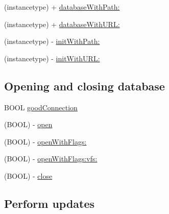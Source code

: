  

 \begin{DoxyCompactItemize}
\item 
(instancetype) + \mbox{\hyperlink{interface_o_p_t_l_y_f_m_d_b_database_a3828d13a7756446dca522294b569e0e7}{database\+With\+Path\+:}}
\item 
(instancetype) + \mbox{\hyperlink{interface_o_p_t_l_y_f_m_d_b_database_a13bb79efcda5db13674420ac4f805dd5}{database\+With\+U\+R\+L\+:}}
\item 
(instancetype) -\/ \mbox{\hyperlink{interface_o_p_t_l_y_f_m_d_b_database_a146d2b8c55019b67f45217aeb008e78e}{init\+With\+Path\+:}}
\item 
(instancetype) -\/ \mbox{\hyperlink{interface_o_p_t_l_y_f_m_d_b_database_a4fe721948e8ceefcdd65f0850b7c07b7}{init\+With\+U\+R\+L\+:}}
\end{DoxyCompactItemize}
\subsection*{Opening and closing database}
\label{_amgrp53491ef07cbf8f5e62a2c5067f8c9c29}%


 

 \begin{DoxyCompactItemize}
\item 
B\+O\+OL \mbox{\hyperlink{interface_o_p_t_l_y_f_m_d_b_database_ae9afe3b7a030648d6f719f53678bb9ba}{good\+Connection}}
\item 
(B\+O\+OL) -\/ \mbox{\hyperlink{interface_o_p_t_l_y_f_m_d_b_database_afc3b896f0808f555b09064bb6d514f93}{open}}
\item 
(B\+O\+OL) -\/ \mbox{\hyperlink{interface_o_p_t_l_y_f_m_d_b_database_a088fc6d53b7e5b2713d5cacef74807ad}{open\+With\+Flags\+:}}
\item 
(B\+O\+OL) -\/ \mbox{\hyperlink{interface_o_p_t_l_y_f_m_d_b_database_a5019a19308c2d2f53901bc15e18b2f31}{open\+With\+Flags\+:vfs\+:}}
\item 
(B\+O\+OL) -\/ \mbox{\hyperlink{interface_o_p_t_l_y_f_m_d_b_database_a6979a72ddb72bf8187a06607943bee98}{close}}
\end{DoxyCompactItemize}
\subsection*{Perform updates}
\label{_amgrpbca248ee7e608fbce8913fd2bf72d636}%


 

